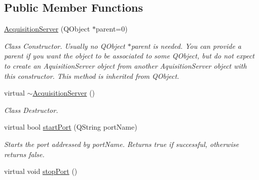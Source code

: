 \subsection*{Public Member Functions}
\begin{DoxyCompactItemize}
\item 
\hyperlink{classAcquisitionServer_aa46879983f2e52ac9d7a3025a7cd5db1}{Acquisition\+Server} (Q\+Object $\ast$parent=0)
\begin{DoxyCompactList}\small\item\em Class Constructor. Usually no Q\+Object $\ast$parent is needed. You can provide a parent if you want the object to be associated to some Q\+Object, but do not expect to create an Aquisition\+Server object from another Aquisition\+Server object with this constructor. This method is inherited from Q\+Object. \end{DoxyCompactList}\item 
\hypertarget{classAcquisitionServer_ab338a259f798ee4aae5138eab86be25c}{virtual \hyperlink{classAcquisitionServer_ab338a259f798ee4aae5138eab86be25c}{$\sim$\+Acquisition\+Server} ()}\label{classAcquisitionServer_ab338a259f798ee4aae5138eab86be25c}

\begin{DoxyCompactList}\small\item\em Class Destructor. \end{DoxyCompactList}\item 
virtual bool \hyperlink{classAcquisitionServer_acef57dade37889fb65b3026578e33522}{start\+Port} (Q\+String port\+Name)
\begin{DoxyCompactList}\small\item\em Starts the port addressed by port\+Name. Returns true if successful, otherwise returns false. \end{DoxyCompactList}\item 
\hypertarget{classAcquisitionServer_a8599a0d29401fdc387870a7bfbbdbdaf}{virtual void \hyperlink{classAcquisitionServer_a8599a0d29401fdc387870a7bfbbdbdaf}{stop\+Port} ()}\label{classAcquisitionServer_a8599a0d29401fdc387870a7bfbbdbdaf}


\end{DoxyCompactItemize}
